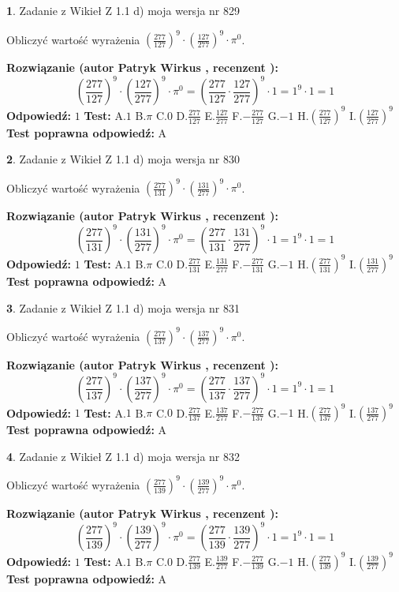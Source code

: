 \documentclass[12pt, a4paper]{article}
\theoremstyle{definition} %
\newtheorem{zad}{}
\newcommand{\zadStart}[1]{\begin{zad}#1\newline}
\newcommand{\zadStop}{\end{zad}}
\newcommand{\rozwStart}[2]{\noindent \textbf{Rozwiązanie (autor #1 , recenzent #2): }\newline}
\newcommand{\rozwStop}{\newline}
\newcommand{\odpStart}{\noindent \textbf{Odpowiedź:}\newline}
\newcommand{\odpStop}{\newline}
\newcommand{\testStart}{\noindent \textbf{Test:}\newline}
\newcommand{\testStop}{\newline}
\newcommand{\kluczStart}{\noindent \textbf{Test poprawna odpowiedź:}\newline}
\newcommand{\kluczStop}{\newline}
\begin{document}
\zadStart{Zadanie z Wikieł Z 1.1 d) moja wersja nr 829}

Obliczyć wartość wyrażenia $(\frac{277}{127})^{9} \cdot (\frac{127}{277})^{9} \cdot \pi^{0}$.
\zadStop
\rozwStart{Patryk Wirkus}{}
$$(\frac{277}{127})^{9} \cdot (\frac{127}{277})^{9} \cdot \pi^{0} = (\frac{277}{127} \cdot \frac{127}{277})^{9} \cdot 1 = 1^{9} \cdot 1 = 1$$
\rozwStop
\odpStart
$1$
\odpStop
\testStart
A.$1$ B.$\pi$ C.$0$ D.$\frac{277}{127}$ E.$\frac{127}{277}$
F.$-\frac{277}{127}$ G.$-1$
H.$(\frac{277}{127})^{9}$
I.$(\frac{127}{277})^{9}$
\testStop
\kluczStart
A
\kluczStop



\zadStart{Zadanie z Wikieł Z 1.1 d) moja wersja nr 830}

Obliczyć wartość wyrażenia $(\frac{277}{131})^{9} \cdot (\frac{131}{277})^{9} \cdot \pi^{0}$.
\zadStop
\rozwStart{Patryk Wirkus}{}
$$(\frac{277}{131})^{9} \cdot (\frac{131}{277})^{9} \cdot \pi^{0} = (\frac{277}{131} \cdot \frac{131}{277})^{9} \cdot 1 = 1^{9} \cdot 1 = 1$$
\rozwStop
\odpStart
$1$
\odpStop
\testStart
A.$1$ B.$\pi$ C.$0$ D.$\frac{277}{131}$ E.$\frac{131}{277}$
F.$-\frac{277}{131}$ G.$-1$
H.$(\frac{277}{131})^{9}$
I.$(\frac{131}{277})^{9}$
\testStop
\kluczStart
A
\kluczStop



\zadStart{Zadanie z Wikieł Z 1.1 d) moja wersja nr 831}

Obliczyć wartość wyrażenia $(\frac{277}{137})^{9} \cdot (\frac{137}{277})^{9} \cdot \pi^{0}$.
\zadStop
\rozwStart{Patryk Wirkus}{}
$$(\frac{277}{137})^{9} \cdot (\frac{137}{277})^{9} \cdot \pi^{0} = (\frac{277}{137} \cdot \frac{137}{277})^{9} \cdot 1 = 1^{9} \cdot 1 = 1$$
\rozwStop
\odpStart
$1$
\odpStop
\testStart
A.$1$ B.$\pi$ C.$0$ D.$\frac{277}{137}$ E.$\frac{137}{277}$
F.$-\frac{277}{137}$ G.$-1$
H.$(\frac{277}{137})^{9}$
I.$(\frac{137}{277})^{9}$
\testStop
\kluczStart
A
\kluczStop



\zadStart{Zadanie z Wikieł Z 1.1 d) moja wersja nr 832}

Obliczyć wartość wyrażenia $(\frac{277}{139})^{9} \cdot (\frac{139}{277})^{9} \cdot \pi^{0}$.
\zadStop
\rozwStart{Patryk Wirkus}{}
$$(\frac{277}{139})^{9} \cdot (\frac{139}{277})^{9} \cdot \pi^{0} = (\frac{277}{139} \cdot \frac{139}{277})^{9} \cdot 1 = 1^{9} \cdot 1 = 1$$
\rozwStop
\odpStart
$1$
\odpStop
\testStart
A.$1$ B.$\pi$ C.$0$ D.$\frac{277}{139}$ E.$\frac{139}{277}$
F.$-\frac{277}{139}$ G.$-1$
H.$(\frac{277}{139})^{9}$
I.$(\frac{139}{277})^{9}$
\testStop
\kluczStart
A
\kluczStop
\end{document}
